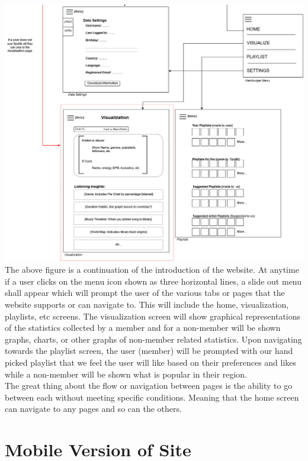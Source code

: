 \documentclass[letter, 11pt]{article}
\begin{document}
\includegraphics[scale=0.57,left]{storyboard_2.png}
The above figure is a continuation of the introduction of the website. At anytime if a user clicks on the menu icon shown as three horizontal lines, a slide out menu shall appear which will prompt the user of the various tabs or pages that the website supports or can navigate to. This will include the home, visualization, playlists, etc screens. The visualization screen will show graphical representations of the statistics collected by a member and for a non-member will be shown graphs, charts, or other graphs of non-member related statistics. Upon navigating towards the playlist screen, the user (member) will be prompted with our hand picked playlist that we feel the user will like based on their preferences and likes while a non-member will be shown what is popular in their region.\\
The great thing about the flow or navigation between pages is the ability to go between each without meeting specific conditions. Meaning that the home screen can navigate to any pages and so can the others.\\

\section*{Mobile Version of Site}\\
\end{document}
